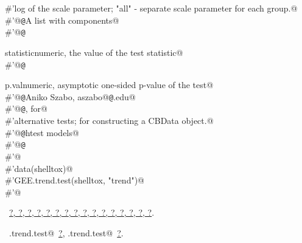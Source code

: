 \documentclass[reqno]{amsart}
\renewcommand{\NWlink}[2]{\hyperlink{#1}{#2}}
\begin{document}
\begin{flushleft}
\begin{list}{}{}
\mbox{}\verb@#'log of the scale parameter; "all" - separate scale parameter for each group.@\\
\mbox{}\verb@#'@{\tt @}\verb@return A list with components@\\
\mbox{}\verb@#'@{\tt @}\verb@return \item{statistic}{numeric, the value of the test statistic}@\\
\mbox{}\verb@#'@{\tt @}\verb@return \item{p.val}{numeric, asymptotic one-sided p-value of the test}@\\
\mbox{}\verb@#'@{\tt @}\verb@author Aniko Szabo, aszabo@{\tt @}\verb@mcw.edu@\\
\mbox{}\verb@#'@{\tt @}\verb@seealso {},  for@\\
\mbox{}\verb@#'alternative tests;  for constructing a CBData object.@\\
\mbox{}\verb@#'@{\tt @}\verb@keywords htest models@\\
\mbox{}\verb@#'@{\tt @}\verb@examples@\\
\mbox{}\verb@#'@\\
\mbox{}\verb@#'data(shelltox)@\\
\mbox{}\verb@#'GEE.trend.test(shelltox, "trend")@\\
\mbox{}\verb@#'@\\
\mbox{}\verb@@{\NWsep}
\end{list}
\vspace{-1.5ex}
\footnotesize
\begin{list}{}{\setlength{\itemsep}{-\parsep}\setlength{\itemindent}{-\leftmargin}}
\item \NWtxtFileDefBy\ \NWlink{nuweb?}{?}\NWlink{nuweb?}{, ?}\NWlink{nuweb?}{, ?}\NWlink{nuweb?}{, ?}\NWlink{nuweb?}{, ?}\NWlink{nuweb?}{, ?}\NWlink{nuweb?}{, ?}\NWlink{nuweb?}{, ?}\NWlink{nuweb?}{, ?}\NWlink{nuweb?}{, ?}\NWlink{nuweb?}{, ?}\NWlink{nuweb?}{, ?}\NWlink{nuweb?}{, ?}\NWlink{nuweb?}{, ?}\NWlink{nuweb?}{, ?}\NWlink{nuweb?}{, ?}.
\item \NWtxtIdentsUsed\nobreak\  \verb@GEE.trend.test@\nobreak\ \NWlink{nuweb?}{?}, \verb@RS.trend.test@\nobreak\ \NWlink{nuweb?}{?}.
\item{}
\end{list}
\vspace{4ex}
\end{flushleft}
\end{document}

